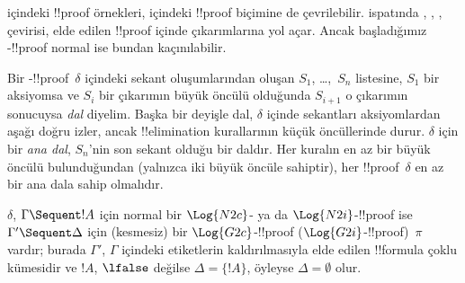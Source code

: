  içindeki !!{proof} örnekleri,  içindeki !!{proof} biçimine
de çevrilebilir.  ispatında
\Elim{\land}, \Elim{\lif}, \Elim{\lnot}, \Elim{\lforall} çevirisi,
elde edilen  !!{proof} içinde \Cut{} çıkarımlarına yol açar.
Ancak başladığımız -!!{proof} normal ise bundan kaçınılabilir.

Bir -!!{proof}~$\delta$ içindeki sekant oluşumlarından
oluşan $S_1$, \dots,~$S_n$ listesine, $S_1$ bir aksiyomsa ve $S_i$ bir
çıkarımın büyük öncülü olduğunda $S_{i+1}$ o çıkarımın sonucuysa
\emph{dal} diyelim. Başka bir deyişle dal, $\delta$ içinde sekantları
aksiyomlardan aşağı doğru izler, ancak !!{elimination}
kurallarının küçük öncüllerinde durur. $\delta$ için bir \emph{ana dal},
$S_n$'nin son sekant olduğu bir daldır. Her kuralın en az bir büyük
öncülü bulunduğundan (yalnızca \Intro{\land} iki büyük öncüle sahiptir),
her !!{proof}~$\delta$ en az bir ana dala sahip olmalıdır.


\begin{prop} $\delta$, $\Gamma \Sequent
!A$ için normal bir $\Log{N2c}$- ya da $\Log{N2i}$-!!{proof} ise
$\Gamma' \Sequent \Delta$ için (kesmesiz) bir $\Log{G2c}$-!!{proof}
($\Log{G2i}$-!!{proof})~$\pi$ vardır; burada $\Gamma'$, $\Gamma$
içindeki etiketlerin kaldırılmasıyla elde edilen !!{formula} çoklu
kümesidir ve $!A$, $\lfalse$ değilse $\Delta = \{!A\}$, öyleyse
$\Delta = \emptyset$ olur.
\end{prop}

